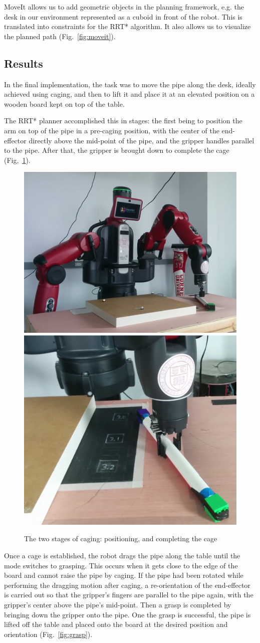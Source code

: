 \documentclass[runningheads,letterpaper]{llncs}
\begin{document}
MoveIt allows us to add geometric objects in the planning framework, e.g. the desk in our environment represented as a cuboid in front of the robot. This is translated into constraints for the RRT* algorithm. It also allows us to visualize the planned path (Fig.~\ref{fig:moveit}).

\subsection{Results}
In the final implementation, the task was to move the pipe along the desk, ideally achieved using caging, and then to lift it and place it at an elevated position on a wooden board kept on top of the table.

The RRT* planner accomplished this in stages: the first being to position the arm on top of the pipe in a pre-caging position, with the center of the end-effector directly above the mid-point of the pipe, and the gripper handles parallel to the pipe. After that, the gripper is brought down to complete the cage (Fig,~\ref{fig:cage}).

\begin{figure}[ht]
\centering
	\includegraphics[height=0.4\columnwidth]{images/mid_pt.png}
	\includegraphics[height=0.4\columnwidth]{images/cage.png}	
\caption{The two stages of caging: positioning, and completing the cage}
\label{fig:cage}
\end{figure} 

Once a cage is established, the robot drags the pipe along the table until the mode switches to grasping. This occurs when it gets close to the edge of the board and cannot raise the pipe by caging. If the pipe had been rotated while performing the dragging motion after caging, a re-orientation of the end-effector is carried out so that the gripper's fingers are parallel to the pipe again, with the gripper's center above the pipe's mid-point. Then a grasp is completed by bringing down the gripper onto the pipe. One the grasp is successful, the pipe is lifted off the table and placed onto the board at the desired position and orientation (Fig.~\ref{fig:grasp}).
\end{document}
